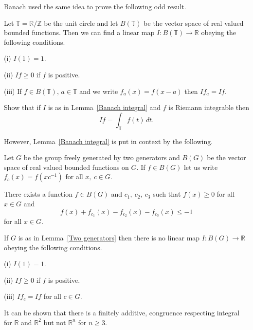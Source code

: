 Banach used the same idea to prove the following
odd result.
\begin{lemma}\label{Banach integral} 
Let ${\mathbb T}={\mathbb R}/{\mathbb Z}$
be the unit circle and let $B({\mathbb T})$ be the 
vector space
of real valued bounded functions.
Then we can find a linear map 
$I:B({\mathbb T})\rightarrow{\mathbb R}$ obeying the following conditions.

(i) $I(1)=1$.

(ii) $If\geq 0$ if $f$ is positive.

(iii) If $f\in B({\mathbb T})$, $a\in{\mathbb T}$ and
we write $f_{a}(x)=f(x-a)$ then $If_{a}=If$.
\end{lemma}
\begin{exercise} Show that if $I$ is as in
Lemma~\ref{Banach integral} and $f$ is Riemann
integrable then 
\[If=\int_{\mathbb T}f(t)\,dt.\]
\end{exercise}

However, Lemma~\ref{Banach integral} is put in context
by the following.
\begin{lemma}\label{Two generators}
Let $G$ be the group freely generated by
two generators and $B(G)$ be the 
vector space
of real valued bounded functions on $G$.
If $f\in B(G)$ let us write $f_{c}(x)=f(xc^{-1})$
for all $x,\ c\in G$.  

There exists a function $f\in B(G)$ 
and $c_{1},\ c_{2},\ c_{3}$ such that
$f(x)\geq 0$ for all $x\in G$ and
\[f(x)+f_{c_{1}}(x)-f_{c_{2}}(x)-f_{c_{3}}(x)\leq -1\]
for all $x\in G$. 
\end{lemma}
\begin{exercise} If $G$ is as in Lemma~\ref{Two generators}
then there is no linear map $I:B(G)\rightarrow{\mathbb R}$
obeying the following conditions.

(i) $I(1)=1$.

(ii) $If\geq 0$ if $f$ is positive.

(iii)  $If_{c}=If$ for all $c\in G$.
\end{exercise}
It can be shown that there is a finitely additive,
congruence respecting integral for ${\mathbb R}$ and
${\mathbb R}^{2}$ but not ${\mathbb R}^{n}$ for $n\geq 3$.
